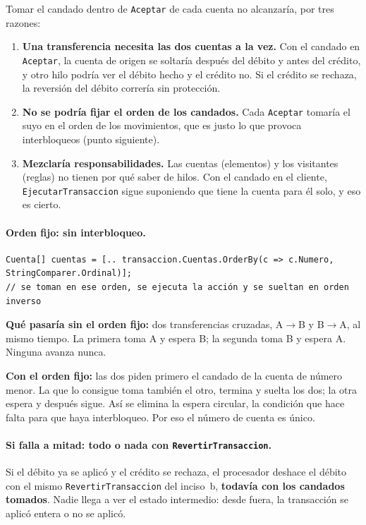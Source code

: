 Tomar el candado dentro de \texttt{Aceptar} de cada cuenta no alcanzaría, por tres razones:
\begin{enumerate}
  \item \textbf{Una transferencia necesita las dos cuentas a la vez.} Con el candado en
        \texttt{Aceptar}, la cuenta de origen se soltaría después del débito y antes del
        crédito, y otro hilo podría ver el débito hecho y el crédito no. Si el crédito se
        rechaza, la reversión del débito correría sin protección.
  \item \textbf{No se podría fijar el orden de los candados.} Cada \texttt{Aceptar} tomaría el
        suyo en el orden de los movimientos, que es justo lo que provoca interbloqueos (punto
        siguiente).
  \item \textbf{Mezclaría responsabilidades.} Las cuentas (elementos) y los visitantes
        (reglas) no tienen por qué saber de hilos. Con el candado en el cliente,
        \texttt{EjecutarTransaccion} sigue suponiendo que tiene la cuenta para él solo, y eso
        es cierto.
\end{enumerate}

\paragraph{Orden fijo: sin interbloqueo.}

\begin{lstlisting}[basicstyle=\ttfamily\footnotesize, columns=fullflexible, keepspaces=true]
Cuenta[] cuentas = [.. transaccion.Cuentas.OrderBy(c => c.Numero, StringComparer.Ordinal)];
// se toman en ese orden, se ejecuta la acción y se sueltan en orden inverso
\end{lstlisting}

\textbf{Qué pasaría sin el orden fijo:} dos transferencias cruzadas, A$\rightarrow$B y
B$\rightarrow$A, al mismo tiempo. La primera toma A y espera B; la segunda toma B y espera A.
Ninguna avanza nunca.

\textbf{Con el orden fijo:} las dos piden primero el candado de la cuenta de número menor. La
que lo consigue toma también el otro, termina y suelta los dos; la otra espera y después
sigue. Así se elimina la espera circular, la condición que hace falta para que haya
interbloqueo. Por eso el número de cuenta es único.

\paragraph{Si falla a mitad: todo o nada con \texttt{RevertirTransaccion}.}
Si el débito ya se aplicó y el crédito se rechaza, el procesador deshace el débito con el mismo
\texttt{RevertirTransaccion} del inciso~b, \textbf{todavía con los candados tomados}. Nadie
llega a ver el estado intermedio: desde fuera, la transacción se aplicó entera o no se aplicó.

